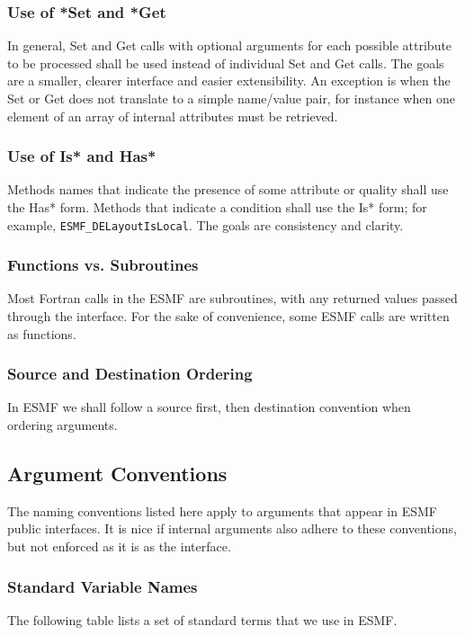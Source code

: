 \subsubsection{Use of *Set and *Get} In general, Set and Get calls with optional arguments
for each possible attribute to be processed shall be used instead of individual
Set and Get calls.  The goals are a smaller, clearer interface and easier extensibility.
An exception is when the Set or Get does not translate to a simple name/value pair,
for instance when one element of an array of internal attributes must be retrieved.

\subsubsection{Use of Is* and Has*} Methods names that indicate the 
presence of some attribute or quality shall use the Has* form.  Methods 
that indicate a condition shall use the Is* form; for example, 
{\tt ESMF\_DELayoutIsLocal}.  The goals are consistency and clarity.

\subsubsection{Functions vs. Subroutines}
Most Fortran calls in the ESMF are subroutines, with 
any returned values passed through the interface.  For the sake of 
convenience, some ESMF calls are written as functions.

\subsubsection{Source and Destination Ordering}
In ESMF we shall follow a source first, then destination convention when ordering
arguments.

\subsection{Argument Conventions}

The naming conventions listed here apply to arguments that appear in 
ESMF public interfaces.  It is nice if internal arguments also adhere
to these conventions, but not enforced as it is as the interface.

\subsubsection{Standard Variable Names}

The following table lists a set of standard terms that we use in ESMF.

